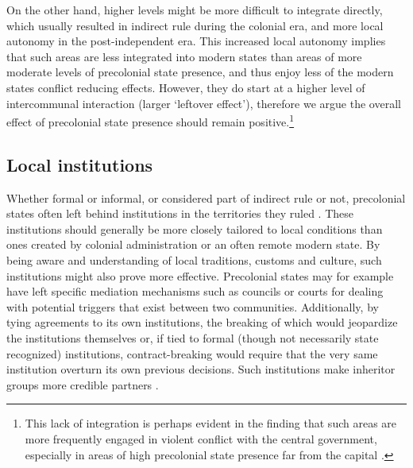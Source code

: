 \documentclass[12pt]{article}
\begin{document}
On the other hand, higher levels might be more difficult to integrate directly,
which usually resulted in indirect rule during the colonial era, and more local
autonomy in the post-independent era. This increased local autonomy implies that
such areas are less integrated into modern states than areas of more moderate
levels of precolonial state presence, and thus enjoy less of the modern states
conflict reducing effects. However, they do start at a higher level of
intercommunal interaction (larger `leftover effect'), therefore we argue the
overall effect of precolonial state presence should remain
positive.\footnote{This lack of integration is perhaps evident in the finding
	that such areas are more frequently engaged in violent conflict with the
	central government, especially in areas of high precolonial state
presence far from the capital \citep{Wishman2021}.}


\subsection{Local institutions}

Whether formal or informal, or considered part of indirect rule or not,
precolonial states often left behind institutions in the territories they ruled
\citep{Wig2016, Wig2018}. These institutions should generally be more closely
tailored to local conditions than ones created by colonial administration or an
often remote modern state. By being aware and understanding of local traditions,
customs and culture, such institutions might also prove more effective.
Precolonial states may for example have left specific mediation mechanisms such
as councils or courts for dealing with potential triggers that exist between two
communities. Additionally, by tying agreements to its own institutions,
the breaking of which would jeopardize the institutions themselves or, if tied
to formal (though not necessarily state recognized) institutions,
contract-breaking would require that the very same institution overturn its
own previous decisions. Such institutions make inheritor groups more credible
partners \citep{Wig2018}.

\end{document}

